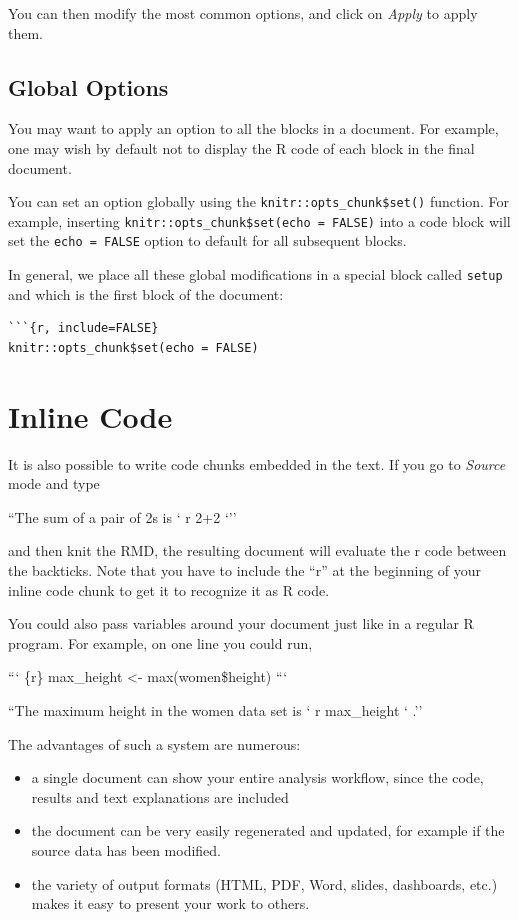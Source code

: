 \documentclass[
  letterpaper,
  DIV=11,
  numbers=noendperiod]{scrreprt}
\begin{document}
You can then modify the most common options, and click on \emph{Apply}
to apply them.

\subsection{Global Options}\label{global-options}

You may want to apply an option to all the blocks in a document. For
example, one may wish by default not to display the R code of each block
in the final document.

You can set an option globally using the
\texttt{knitr::opts\_chunk\$set()} function. For example, inserting
\texttt{knitr::opts\_chunk\$set(echo\ =\ FALSE)} into a code block will
set the \texttt{echo\ =\ FALSE} option to default for all subsequent
blocks.

In general, we place all these global modifications in a special block
called \texttt{setup} and which is the first block of the document:

\begin{verbatim}
```{r, include=FALSE}
knitr::opts_chunk$set(echo = FALSE)
\end{verbatim}

\section{Inline Code}\label{inline-code}

It is also possible to write code chunks embedded in the text. If you go
to \emph{Source} mode and type

``The sum of a pair of 2s is ` r 2+2 `''

and then knit the RMD, the resulting document will evaluate the r code
between the backticks. Note that you have to include the ``r'' at the
beginning of your inline code chunk to get it to recognize it as R code.

You could also pass variables around your document just like in a
regular R program. For example, on one line you could run,

``` \{r\} max\_height \textless- max(women\$height) ```

``The maximum height in the women data set is ` r max\_height ` .''

The advantages of such a system are numerous:

\begin{itemize}
\item
  a single document can show your entire analysis workflow, since the
  code, results and text explanations are included
\item
  the document can be very easily regenerated and updated, for example
  if the source data has been modified.
\item
  the variety of output formats (HTML, PDF, Word, slides, dashboards,
  etc.) makes it easy to present your work to others.
\end{itemize}
\end{document}
